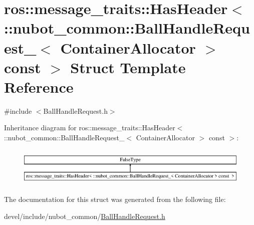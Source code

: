 \hypertarget{structros_1_1message__traits_1_1HasHeader_3_01_1_1nubot__common_1_1BallHandleRequest___3_01Conta6a99718f759f96d9689d2c2cdc44697c}{\section{ros\-:\-:message\-\_\-traits\-:\-:Has\-Header$<$ \-:\-:nubot\-\_\-common\-:\-:Ball\-Handle\-Request\-\_\-$<$ Container\-Allocator $>$ const $>$ Struct Template Reference}
\label{structros_1_1message__traits_1_1HasHeader_3_01_1_1nubot__common_1_1BallHandleRequest___3_01Conta6a99718f759f96d9689d2c2cdc44697c}
}


{\ttfamily \#include $<$Ball\-Handle\-Request.\-h$>$}

Inheritance diagram for ros\-:\-:message\-\_\-traits\-:\-:Has\-Header$<$ \-:\-:nubot\-\_\-common\-:\-:Ball\-Handle\-Request\-\_\-$<$ Container\-Allocator $>$ const $>$\-:\begin{figure}[H]
\begin{center}
\leavevmode
\includegraphics[height=1.869783cm]{structros_1_1message__traits_1_1HasHeader_3_01_1_1nubot__common_1_1BallHandleRequest___3_01Conta6a99718f759f96d9689d2c2cdc44697c}
\end{center}
\end{figure}


The documentation for this struct was generated from the following file\-:\begin{DoxyCompactItemize}
\item 
devel/include/nubot\-\_\-common/\hyperlink{BallHandleRequest_8h}{Ball\-Handle\-Request.\-h}\end{DoxyCompactItemize}
